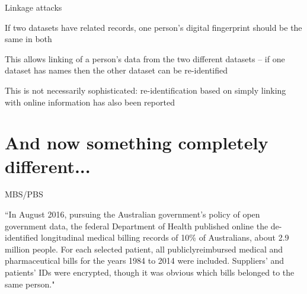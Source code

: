 \documentclass[12pt,aspectratio=169,handout]{beamer}
\begin{document}
\begin{frame}{Linkage attacks}

If two datasets have related records, one person’s digital fingerprint should be the same in both

This allows linking of a person's data from the two different datasets -- if one dataset has names then the other dataset can be re-identified

This is not necessarily sophisticated: re-identification based on simply linking with online information has also been reported


\end{frame}


\section{And now something completely different...}

\begin{frame}{MBS/PBS}

``In August 2016, pursuing the Australian government’s policy of open government data, the federal Department of Health published online the de-identified longitudinal medical billing records of 10\% of Australians, about 2.9 million people. For each selected patient, all publiclyreimbursed medical and pharmaceutical bills for the years 1984 to 2014 were included. Suppliers' and patients' IDs were encrypted, though it was obvious which bills belonged to the same person." \citep[p.~1]{Culnane.et.al.2017.arXiv}



\end{frame}
\end{document}
